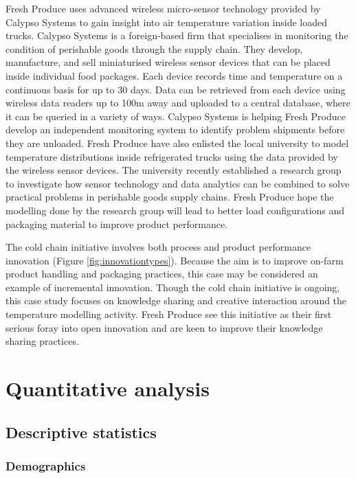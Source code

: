 Fresh Produce uses advanced wireless micro-sensor technology provided by Calypso Systems to gain insight into air temperature variation inside loaded trucks. Calypso Systems is a foreign-based firm that specialises in monitoring the condition of perishable goods through the supply chain. They develop, manufacture, and sell miniaturised wireless sensor devices that can be placed inside individual food packages. Each device records time and temperature on a continuous basis for up to 30 days. Data can be retrieved from each device using wireless data readers up to 100m away and uploaded to a central database, where it can be queried in a variety of ways. Calypso Systems is helping Fresh Produce develop an independent monitoring system to identify problem shipments before they are unloaded. Fresh Produce have also enlisted the local university to model temperature distributions inside refrigerated trucks using the data provided by the wireless sensor devices. The university recently established a research group to investigate how sensor technology and data analytics can be combined to solve practical problems in perishable goods supply chains. Fresh Produce hope the modelling done by the research group will lead to better load configurations and packaging material to improve product performance.\medskip

The cold chain initiative involves both process and product performance innovation (Figure \ref{fig:innovationtypes}). Because the aim is to improve on-farm product handling and packaging practices, this case may be considered an example of incremental innovation. Though the cold chain initiative is ongoing, this case study focuses on knowledge sharing and creative interaction around the temperature modelling activity. Fresh Produce see this initiative as their first serious foray into open innovation and are keen to improve their knowledge sharing practices.\medskip

\section{Quantitative analysis}

\subsection{Descriptive statistics}

\subsubsection{Demographics}

